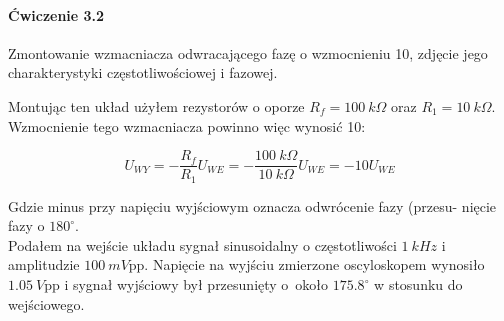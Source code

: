 \documentclass[14pt, table]{extarticle}
\begin{document}
\begin{figure}[H]
    \centering
    \qquad
\end{figure}

\newpage
\paragraph{Ćwiczenie 3.2 \\}
Zmontowanie wzmacniacza odwracającego fazę o wzmocnieniu 10, zdjęcie jego charakterystyki częstotliwościowej i fazowej.

\begin{figure}[H]
    \centering
    \subfloat[\centering ]{{\texttt{[image: C1]}}}%
    \qquad
    \subfloat[\centering ]{{\texttt{[image: C2]}}}%
\end{figure}

Montując ten układ użyłem rezystorów o oporze $R_f = 100 \ k \Omega$ oraz $R_1 = 10 \ k \Omega$. Wzmocnienie tego wzmacniacza powinno więc wynosić 10:

$$ U_{WY} = - \frac{R_f}{R_1} U_{WE} = - \frac{100 \ k \Omega}{10 \ k \Omega} U_{WE} = -10 U_{WE} $$

Gdzie minus przy napięciu wyjściowym oznacza odwrócenie fazy (przesu- nięcie fazy o $180^{\circ}$. \\

Podałem na wejście układu sygnał sinusoidalny o częstotliwości $1 \ kHz$ i amplitudzie $100 \ mV$pp. Napięcie na wyjściu zmierzone oscyloskopem wynosiło $1.05 \ V$pp i sygnał wyjściowy był przesunięty o około $175.8^{\circ}$ w stosunku do wejściowego.
\end{document}
